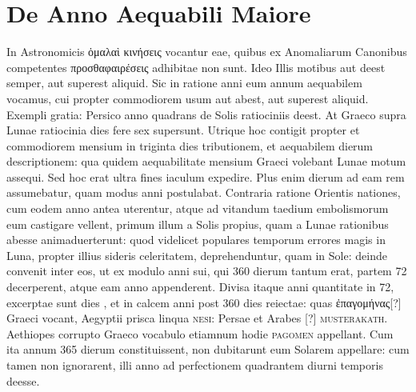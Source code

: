 

\chapter{De Anno Aequabili Maiore}
%
In Astronomicis \textgreek{ὁμαλαὶ κινήσεις} vocantur
eae, quibus ex Anomaliarum Canonibus
competentes \textgreek{προσθαφαιρέσεις} adhibitae non
sunt.
Ideo Illis motibus aut deest semper,
aut superest aliquid.
Sic in ratione anni
eum annum aequabilem vocamus, cui propter
commodiorem usum aut abest, aut superest aliquid.
Exempli gratia: Persico anno
quadrans de Solis ratiociniis deest.
At
Graeco supra Lunae ratiocinia dies fere sex supersunt.
Utrique hoc contigit
propter et commodiorem mensium in triginta dies tributionem,
et aequabilem dierum descriptionem: qua quidem aequabilitate mensium
Graeci volebant Lunae motum assequi.
Sed hoc erat ultra fines
iaculum expedire.
Plus enim dierum ad eam rem assumebatur, quam
modus anni postulabat.
Contraria ratione Orientis nationes, cum
eodem anno antea uterentur, atque ad vitandum taedium embolismorum
eum castigare vellent, primum illum a Solis propius, quam
a Lunae rationibus abesse animaduerterunt: quod videlicet populares
temporum errores magis in Luna, propter illius sideris celeritatem,
deprehenduntur, quam in Sole: deinde convenit inter
eos, ut ex modulo anni sui, qui 360 dierum tantum erat,
partem 72 decerperent, atque eam anno appenderent.
Divisa itaque
anni quantitate in 72, excerptae sunt dies , et in calcem anni
post 360 dies reiectae: quas \textgreek{ἐπαγομήνας}[?] Graeci vocant, Aegyptii
prisca linqua \textsc{nesi}: Persae et Arabes \textarabic{}[?]
 \textsc{musterakath}.
Aethiopes corrupto Graeco vocabulo etiamnum hodie \textsc{pagomen}
appellant.
Cum ita annum 365 dierum constituissent, non dubitarunt
eum Solarem appellare: cum tamen non ignorarent, illi anno ad
perfectionem quadrantem diurni temporis deesse.
